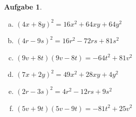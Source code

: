 \documentclass[12pt,fleqn]{article}
\theoremstyle{aufg}
\newtheorem{aufgabe}{Aufgabe}
\theoremstyle{bsp}
\begin{document}
\begin{flushleft}
\begin{aufgabe}
\begin{multicols}{3}
\begin{enumerate}[a)]
\item 
$(4x+8y)^2=16 x^{2} + 64 x y + 64 y^{2}$
\item 
$(4r-9s)^2=16 r^{2} - 72 r s + 81 s^{2}$
\item 
$(9v+8t)(9v-8t)=- 64 t^{2} + 81 v^{2}$
\item 
$(7x+2y)^2=49 x^{2} + 28 x y + 4 y^{2}$
\item 
$(2r-3s)^2=4 r^{2} - 12 r s + 9 s^{2}$
\item 
$(5v+9t)(5v-9t)=- 81 t^{2} + 25 v^{2}$
\end{enumerate} 
\end{multicols} 
\end{aufgabe} 
\end{flushleft} 
\end{document}
